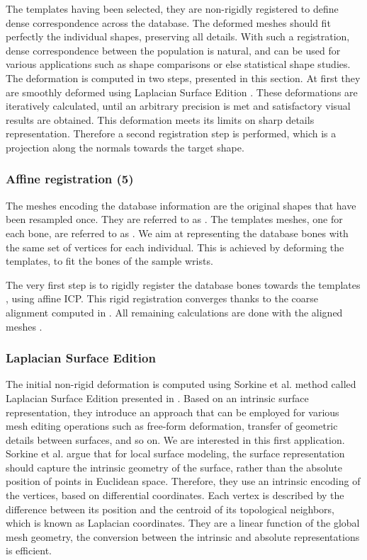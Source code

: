 The templates having been selected, they are non-rigidly registered to define dense correspondence across the database. The deformed meshes should fit perfectly the individual shapes, preserving all details. With such a registration, dense correspondence between the population is natural, and can be used for various applications such as shape comparisons or else statistical shape studies. The deformation is computed in two steps, presented in this section. At first they are smoothly deformed using Laplacian Surface Edition \cite{sorkine_2004_laplacian}. These deformations are iteratively calculated, until an arbitrary precision is met and satisfactory visual results are obtained. This deformation meets its limits on sharp details representation. Therefore a second registration step is performed, which is a projection along the normals towards the target shape. 


\subsubsection{Affine registration (5)}
\label{sssec:rigid_registration}


The meshes encoding the database information are the original shapes that have been resampled once. They are referred to as \md*. The templates meshes, one for each bone, are referred to as \mt*. 
We aim at representing the database bones with the same set of vertices for each individual. This is achieved by deforming the templates, to fit the bones of the sample wrists. 

The very first step is to rigidly register the database bones \md* towards the templates \mt*, using affine ICP. This rigid registration converges thanks to the coarse alignment computed in . All remaining calculations are done with the aligned meshes \mr*. 


\subsubsection{Laplacian Surface Edition}
\label{ssubsec:3_laplacian_description}

The initial non-rigid deformation is computed using Sorkine et al. method called Laplacian Surface Edition presented in \cite{sorkine_2004_laplacian}. Based on an intrinsic surface representation, they introduce an approach that can be employed for various mesh editing operations such as free-form deformation, transfer of geometric details between surfaces, and so on. We are interested in this first application. Sorkine et al. argue that for local surface modeling, the surface representation should capture the intrinsic geometry of the surface, rather than the absolute position of points in Euclidean space. Therefore, they use an intrinsic encoding of the vertices, based on differential coordinates. Each vertex is described by the difference between its position and the centroid of its topological neighbors, which is known as Laplacian coordinates. They are a linear function of the global mesh geometry, the conversion between the intrinsic and absolute representations is efficient. 

